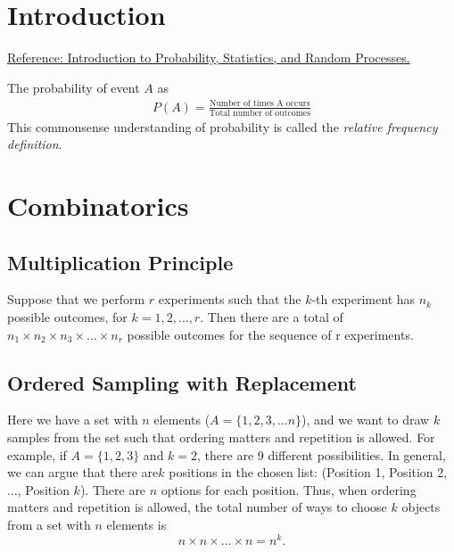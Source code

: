 \section{Introduction}
\label{sec:intro_prob}

\href{https://www.probabilitycourse.com/chapter5/5_2_3_conditioning_independence.php}{Reference: Introduction to Probability, Statistics, and Random Processes.}


The probability of event $A$ as
\begin{align*}
	P(A) = \frac{\text{Number of times A occurs}}{\text{Total number of outcomes}}
\end{align*}
This commonsense understanding of probability is called the \textit{relative frequency definition}.


\section{Combinatorics}

\subsection{Multiplication Principle}
Suppose that we perform $r$ experiments such that the $k$-th experiment has $n_k$ possible outcomes, for $k=1,2,\dots,r$. Then there are a total of $n_1\times n_2\times n_3\times \dots \times n_r$ possible outcomes for the sequence of r experiments.

\subsection{Ordered Sampling with Replacement}
Here we have a set with $n$ elements (\eg $A=\{1,2,3,\dots n\}$), and we want to draw $k$ samples from the set such that ordering matters and repetition is allowed. For example, if $A=\{1,2,3\}$ and $k=2$, there are 9 different possibilities. In general, we can argue that there are$k$ 
positions in the chosen list: (Position 1, Position 2, $\dots$, Position $k$). There are $n$ options for each position. Thus, when ordering matters and repetition is allowed, the total number of ways to choose $k$ objects from a set with $n$ elements is
$$n\times n\times \dots \times n = n^k.$$

